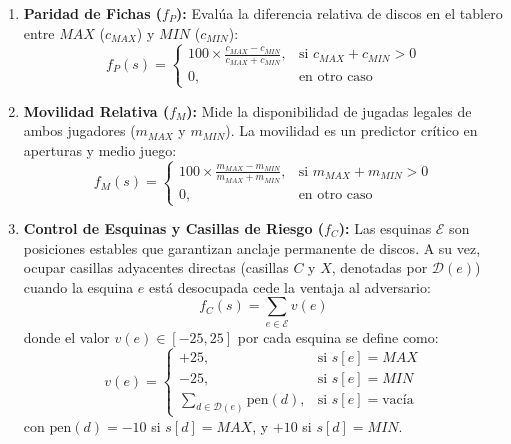 \documentclass[10pt,a4paper]{article}
\begin{document}
\begin{enumerate}
    \item \textbf{Paridad de Fichas ($f_P$):} Evalúa la diferencia relativa de discos en el tablero entre $MAX$ ($c_{MAX}$) y $MIN$ ($c_{MIN}$):
    \begin{equation}
        f_P(s) = 
        \begin{cases}
            100 \times \frac{c_{MAX} - c_{MIN}}{c_{MAX} + c_{MIN}}, & \text{si } c_{MAX} + c_{MIN} > 0 \\
            0, & \text{en otro caso}
        \end{cases}
    \end{equation}

    \item \textbf{Movilidad Relativa ($f_M$):} Mide la disponibilidad de jugadas legales de ambos jugadores ($m_{MAX}$ y $m_{MIN}$). La movilidad es un predictor crítico en aperturas y medio juego:
    \begin{equation}
        f_M(s) = 
        \begin{cases}
            100 \times \frac{m_{MAX} - m_{MIN}}{m_{MAX} + m_{MIN}}, & \text{si } m_{MAX} + m_{MIN} > 0 \\
            0, & \text{en otro caso}
        \end{cases}
    \end{equation}

    \item \textbf{Control de Esquinas y Casillas de Riesgo ($f_C$):} Las esquinas $\mathcal{E}$ son posiciones estables que garantizan anclaje permanente de discos. A su vez, ocupar casillas adyacentes directas (casillas $C$ y $X$, denotadas por $\mathcal{D}(e)$) cuando la esquina $e$ está desocupada cede la ventaja al adversario:
    \begin{equation}
        f_C(s) = \sum_{e \in \mathcal{E}} v(e)
    \end{equation}
    donde el valor $v(e) \in [-25, 25]$ por cada esquina se define como:
    \begin{equation}
        v(e) = 
        \begin{cases}
            +25, & \text{si } s[e] = MAX \\
            -25, & \text{si } s[e] = MIN \\
            \sum_{d \in \mathcal{D}(e)} \text{pen}(d), & \text{si } s[e] = \text{vacía}
        \end{cases}
    \end{equation}
    con $\text{pen}(d) = -10$ si $s[d] = MAX$, y $+10$ si $s[d] = MIN$.


\end{enumerate}
\end{document}
